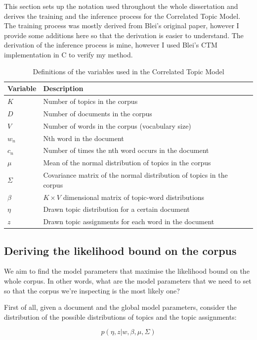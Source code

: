 \documentclass[12pt,a4paper,twoside,openright]{report}
\begin{document}
This section sets up the notation used throughout the whole dissertation and derives the training and the inference process for the Correlated Topic Model. The training process was mostly derived from Blei's original paper, however I provide some additions here so that the derivation is easier to understand. The derivation of the inference process is mine, however I used Blei's CTM implementation in C to verify my method.

\begin{table}
\begin{tabular}{| l | l |}
\hline
Variable & Description \\
\hline
$K$ & Number of topics in the corpus \\
$D$ & Number of documents in the corpus \\
$V$ & Number of words in the corpus (vocabulary size) \\
$w_n$ & Nth word in the document \\
$c_n$ & Number of times the nth word occurs in the document \\
$\mu$ & Mean of the normal distribution of topics in the corpus \\
$\Sigma$ & Covariance matrix of the normal distribution of topics in the corpus \\
$\beta$ & $K \times V$ dimensional matrix of topic-word distributions \\
$\eta$ & Drawn topic distribution for a certain document \\
$z$ & Drawn topic assignments for each word in the document \\
\hline
\end{tabular}
\caption{Definitions of the variables used in the Correlated Topic Model}
\end{table}

\subsection{Deriving the likelihood bound on the corpus}

We aim to find the model parameters that maximise the likelihood bound on the whole corpus. In other words, what are the model parameters that we need to set so that the corpus we're inspecting is the most likely one?

First of all, given a document and the global model parameters, consider the distribution of the possible distributions of topics and the topic assignments:

\begin{equation}
p(\eta, z | w, \beta, \mu, \Sigma)
\end{equation}
\end{document}
